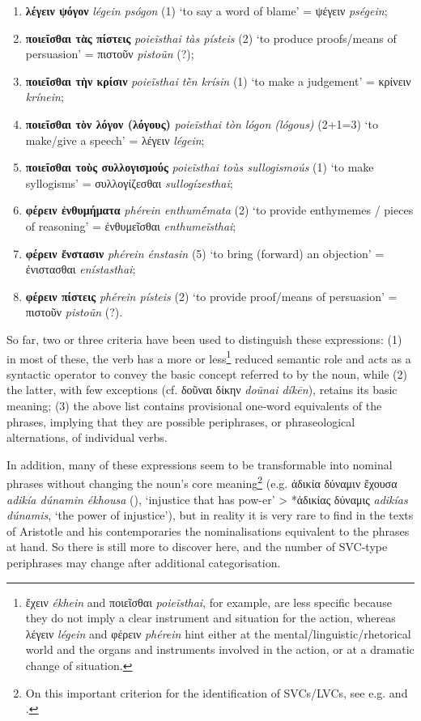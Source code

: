 \documentclass[output=paper,colorlinks,citecolor=brown]{langscibook}
\begin{document}
\begin{enumerate}
    \item \textbf{λέγειν ψόγον} \textit{légein psógon} (1) ‘to say a word of blame' = ψέγειν \textit{pségein};
    \item \textbf{ποιεῖσθαι τὰς πίστεις} \textit{poieĩsthai tàs písteis} (2) ‘to produce proofs/means of persuasion' = πιστοῦν \textit{pistoũn} (?);
    \item \textbf{ποιεῖσθαι τὴν κρίσιν} \textit{poieĩsthai tḕn krísin} (1) ‘to make a judgement' = κρίνειν \textit{krínein};
    \item \textbf{ποιεῖσθαι τὸν λόγον (λόγους)} \textit{poieĩsthai tòn lógon (lógous)} (2+1=3) ‘to make/give a speech' = λέγειν \textit{légein};
    \item \textbf{ποιεῖσθαι τοὺς συλλογισμούς} \textit{poieĩsthai toùs sullogismoús} (1) ‘to make syllogisms' = συλλογίζεσθαι \textit{sullogízesthai};
    \item \textbf{φέρειν ἐνθυμήματα} \textit{phérein enthumḗmata} (2) ‘to provide enthymemes / pieces of reasoning' = ἐνθυμεῖσθαι \textit{enthumeĩsthai};
    \item \textbf{φέρειν ἔνστασιν} \textit{phérein énstasin} (5) ‘to bring (forward) an objection' = ἐνιστασθαι \textit{enístasthai};
    \item \textbf{φέρειν πίστεις} \textit{phérein písteis} (2) ‘to provide proof/means of persuasion' = πιστοῦν \textit{pistoũn} (?).
\end{enumerate}


So far, two or three criteria have been used to distinguish these expressions: (1) in most of these, the verb has a more or less\footnote{ἔχειν \textit{ékhein} and ποιεῖσθαι \textit{poieĩsthai}, for example, are less specific because they do not imply a clear instrument and situation for the action, whereas λέγειν \textit{légein} and φέρειν \textit{phérein} hint either at the mental/linguistic/rhetorical world and the organs and instruments involved in the action, or at a dramatic change of situation.} reduced semantic role and acts as a syntactic operator to convey the basic concept referred to by the noun, while (2) the latter, with few exceptions (cf. δοῦναι δίκην \textit{doũnai díkēn}), retains its basic meaning; (3) the above list contains provisional one-word equivalents of the phrases, implying that they are possible periphrases, or phraseological alternations, of individual verbs. 


In addition, many of these expressions seem to be transformable into nominal phrases without changing the noun’s core meaning\footnote{On this important criterion for the identification of SVCs/LVCs, see e.g. \citet[190--191]{JimenezLopez2016} and \citet[8]{Kovalevskaite-etal2020}.} (e.g. ἀδικία δύναμιν ἔχουσα \textit{adikía dúnamin ékhousa} (), ‘injustice that has pow-er' > *ἀδικίας δύναμις \textit{adikías dúnamis}, ‘the power of injustice'), but in reality it is very rare to find in the texts of Aristotle and his contemporaries the nominalisations equivalent to the phrases at hand. So there is still more to discover here, and the number of SVC-type periphrases may change after additional categorisation. %
\end{document}
